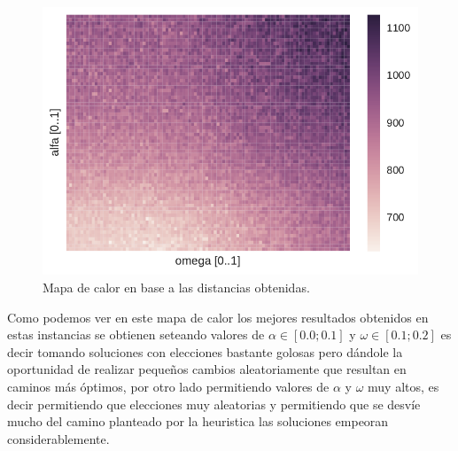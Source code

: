 \begin{figure}[H]
  \begin{center}
    \includegraphics{../experimentacion/ej4/experimento_1.pdf}
    \caption{Mapa de calor en base a las distancias obtenidas.}
    \label{fig:ej3_expAleat_cantCambios}
  \end{center}
\end{figure}

Como podemos ver en este mapa de calor los mejores resultados obtenidos en estas instancias se obtienen seteando valores de $\alpha \in [0.0 ; 0.1]$ y $\omega \in [0.1 ; 0.2]$ es decir tomando soluciones con elecciones bastante golosas pero dándole la oportunidad de realizar pequeños cambios aleatoriamente que resultan en caminos más óptimos, por otro lado permitiendo valores de $\alpha$ y $\omega$ muy altos, es decir permitiendo que elecciones muy aleatorias y permitiendo que se desvíe mucho del camino planteado por la heuristica las soluciones empeoran considerablemente.
